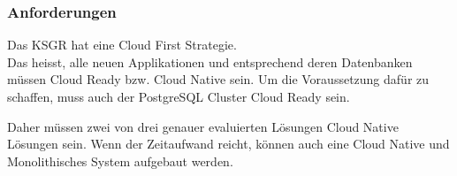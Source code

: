 
\subsubsection{Anforderungen}
\begin{flushleft}
    Das KSGR hat eine Cloud First Strategie.\\
    Das heisst, alle neuen Applikationen und entsprechend deren Datenbanken müssen Cloud Ready bzw.
    Cloud Native sein.
    Um die Voraussetzung dafür zu schaffen, muss auch der PostgreSQL Cluster Cloud Ready sein.
\end{flushleft}
\begin{flushleft}
    Daher müssen zwei von drei genauer evaluierten Lösungen Cloud Native Lösungen sein.
    Wenn der Zeitaufwand reicht, können auch eine Cloud Native und Monolithisches System aufgebaut werden.
\end{flushleft}
\begin{flushleft}
    \begin{landscape}
    
    \end{landscape}
\end{flushleft}
%
